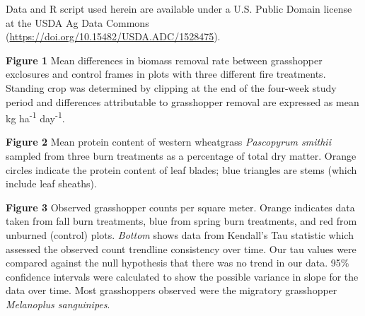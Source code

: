 \documentclass[referee, 
	            sn-basic]
           {sn-jnl}
\begin{document}
\begin{linenumbers}

Data and \textsf{R} script used herein are available under a U.S. Public Domain license at the USDA Ag Data Commons (\href{doi.org/10.15482/USDA.ADC/1528475}{https://doi.org/10.15482/USDA.ADC/1528475}). 



\newpage 

\textbf{Figure 1} Mean differences in biomass removal rate between grasshopper exclosures and control frames in plots with three different fire treatments. 
		Standing crop was determined by clipping at the end of the four-week study period and differences attributable to grasshopper removal are expressed as mean kg ha\textsuperscript{-1} day\textsuperscript{-1}. 

\textbf{Figure 2} Mean protein content of western wheatgrass \emph{Pascopyrum smithii} sampled from three burn treatments as a percentage of total dry matter. 
Orange circles indicate the protein content of leaf blades; blue triangles are stems (which include leaf sheaths).

\textbf{Figure 3} Observed grasshopper counts per square meter. 
Orange indicates data taken from fall burn treatments, blue from spring burn treatments, and red from unburned (control) plots.
\emph{Bottom} shows data from Kendall's Tau statistic which assessed the observed count trendline consistency over time. 
Our tau values were compared against the null hypothesis that there was no trend in our data. 
95\% confidence intervals were calculated to show the possible variance in slope for the data over time. 
Most grasshoppers observed were the migratory grasshopper \emph{Melanoplus sanguinipes}.



\newpage		



\end{linenumbers}
\end{document}
